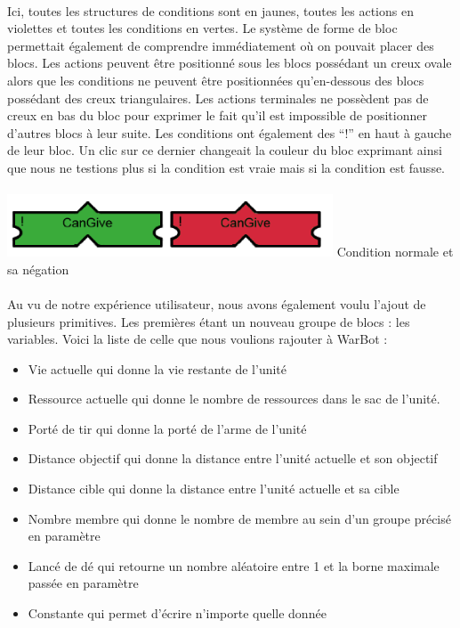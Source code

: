 \documentclass{report}
\begin{document}
\paragraph{}

Ici, toutes les structures de conditions sont en jaunes, toutes les actions en violettes et toutes les conditions en vertes. \newline
Le système de forme de bloc permettait également de comprendre immédiatement où on pouvait placer des blocs. Les actions peuvent être positionné sous les blocs possédant un creux ovale alors que les conditions ne peuvent être positionnées qu’en-dessous des blocs possédant des creux triangulaires.
Les actions terminales ne possèdent pas de creux en bas du bloc pour exprimer le fait qu’il est impossible de positionner d’autres blocs à leur suite. \newline
Les conditions ont également des “!” en haut à gauche de leur bloc. Un clic sur ce dernier changeait la couleur du bloc exprimant ainsi que nous ne testions plus si la condition est vraie mais si la condition est fausse.

\paragraph{}
\begin{center}
\includegraphics[scale=0.8]{DATA/negation.png}
 {Condition normale et sa négation}
\end{center}
\paragraph{}

  Au vu de notre expérience utilisateur, nous avons également voulu l’ajout de plusieurs primitives. Les premières étant un nouveau groupe de blocs : les variables. Voici la liste de celle que nous voulions rajouter à WarBot :
  \begin{itemize}
\item Vie actuelle qui donne la vie restante de l’unité
\item Ressource actuelle qui donne le nombre de ressources dans le sac de l’unité.
\item Porté de tir qui donne la porté de l’arme de l’unité
\item Distance objectif qui donne la distance entre l’unité actuelle et son objectif
\item Distance cible qui donne la distance entre l’unité actuelle et sa cible
\item Nombre membre qui donne le nombre de membre au sein d’un groupe précisé en paramètre
\item Lancé de dé qui retourne un nombre aléatoire entre 1 et la borne maximale passée en paramètre
\item Constante qui permet d’écrire n’importe quelle donnée
\end{itemize}
\end{document}
